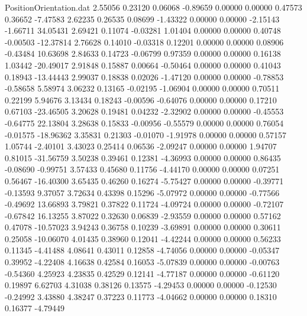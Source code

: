 \begin{filecontents}{PositionOrientation.dat}
   2.55056    0.23120    0.06068    -0.89659    0.00000    0.00000    0.47573    0.36652   -7.47583
   2.62235    0.26535    0.08699    -1.43322    0.00000    0.00000   -2.15143   -1.66711   34.05431
   2.69421    0.11074   -0.03281     1.01404    0.00000    0.00000    0.40748   -0.00503  -12.37814
   2.76628    0.14010   -0.03318     0.12201    0.00000    0.00000    0.08906   -0.43484   10.63698
   2.84633    0.14723   -0.06799     0.97359    0.00000    0.00000    0.16138    1.03442  -20.49017
   2.91848    0.15887    0.00664    -0.50464    0.00000    0.00000    0.41043    0.18943  -13.44443
   2.99037    0.18838    0.02026    -1.47120    0.00000    0.00000   -0.78853   -0.58658    5.58974
   3.06232    0.13165   -0.02195    -1.06904    0.00000    0.00000    0.70511    0.22199    5.94676
   3.13434    0.18243   -0.00596    -0.64076    0.00000    0.00000    0.17210    0.67103  -23.46505
   3.20628    0.19481    0.04232    -2.32902    0.00000    0.00000   -0.45553   -0.64775   22.13804
   3.28638    0.15833   -0.00956    -0.55579    0.00000    0.00000    0.76054   -0.01575  -18.96362
   3.35831    0.21303   -0.01070    -1.91978    0.00000    0.00000    0.57157    1.05744   -2.40101
   3.43023    0.25414    0.06536    -2.09247    0.00000    0.00000    1.94707    0.81015  -31.56759
   3.50238    0.39461    0.12381    -4.36993    0.00000    0.00000    0.86435   -0.08690   -0.99751
   3.57433    0.45680    0.11756    -4.44170    0.00000    0.00000    0.07251    0.56467  -16.40300
   3.65435    0.46260    0.16274    -5.75427    0.00000    0.00000   -0.39771   -0.13593    9.37057
   3.72634    0.43398    0.15296    -5.07972    0.00000    0.00000   -0.77566   -0.49692   13.66893
   3.79821    0.37822    0.11724    -4.09724    0.00000    0.00000   -0.72107   -0.67842   16.13255
   3.87022    0.32630    0.06839    -2.93559    0.00000    0.00000    0.57162    0.47078  -10.57023
   3.94243    0.36758    0.10239    -3.69891    0.00000    0.00000    0.30611    0.25058  -10.06070
   4.01435    0.38960    0.12041    -4.42244    0.00000    0.00000    0.56233    0.11345   -4.41488
   4.08641    0.43011    0.12858    -4.74056    0.00000    0.00000   -0.05347    0.39952   -4.22408
   4.16638    0.42584    0.16053    -5.07839    0.00000    0.00000   -0.00763   -0.54360    4.25923
   4.23835    0.42529    0.12141    -4.77187    0.00000    0.00000   -0.61120    0.19897    6.62703
   4.31038    0.38126    0.13575    -4.29453    0.00000    0.00000   -0.12530   -0.24992    3.43880
   4.38247    0.37223    0.11773    -4.04662    0.00000    0.00000    0.18310    0.16377   -4.79449

\end{filecontents}

